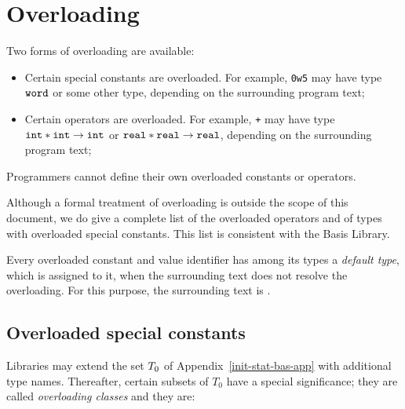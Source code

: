 %

\section{Overloading}
\label{overload.sec}
Two forms of overloading are available:
\begin{itemize}
\item Certain special constants are overloaded.  For example,
{\tt 0w5} may have type $\mbox{\tt word}$ or some other type, depending on
the surrounding program text;
\item Certain operators are overloaded. For example,
{\tt +} may have type $\mbox{\tt int}\ast\mbox{\tt int}\to\mbox{\tt int}$ or
$\mbox{\tt real}\ast\mbox{\tt real}\to\mbox{\tt real}$, depending on
the surrounding program text;
\end{itemize}
Programmers cannot define their own overloaded constants or operators.

Although a formal treatment of overloading is outside the scope
of this document, we do give a complete list of the overloaded operators
and of types with overloaded special constants.
This list is consistent with the Basis Library\cite{sml-basis-lib}.

Every overloaded constant and value identifier has among its types a 
{\em default type},
which is assigned to it, 
when the surrounding text does not resolve the overloading.
For this purpose, the surrounding text is .

\subsection{Overloaded special constants}
Libraries may extend the set $T_0$ of
Appendix~\ref{init-stat-bas-app} with additional type names. Thereafter, certain
subsets of $T_0$ have a special significance;
they are called {\sl overloading classes}
and they are:\medskip


